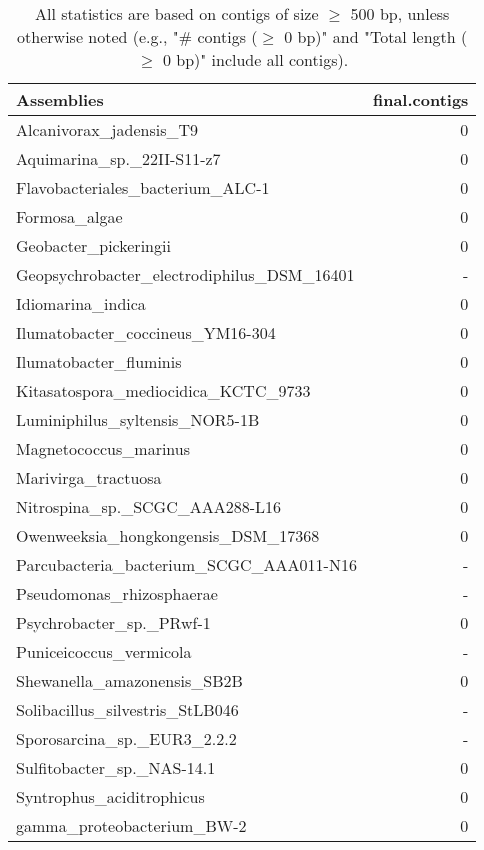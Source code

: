 \documentclass[12pt,a4paper]{article}
\begin{document}
\begin{table}[ht]
\begin{center}
\caption{All statistics are based on contigs of size $\geq$ 500 bp, unless otherwise noted (e.g., "\# contigs ($\geq$ 0 bp)" and "Total length ($\geq$ 0 bp)" include all contigs).}
\begin{tabular}{|l*{1}{|r}|}
\hline
Assemblies & final.contigs \\ \hline
Alcanivorax\_jadensis\_T9 & 0 \\ \hline
Aquimarina\_sp.\_22II-S11-z7 & 0 \\ \hline
Flavobacteriales\_bacterium\_ALC-1 & 0 \\ \hline
Formosa\_algae & 0 \\ \hline
Geobacter\_pickeringii & 0 \\ \hline
Geopsychrobacter\_electrodiphilus\_DSM\_16401 & - \\ \hline
Idiomarina\_indica & 0 \\ \hline
Ilumatobacter\_coccineus\_YM16-304 & 0 \\ \hline
Ilumatobacter\_fluminis & 0 \\ \hline
Kitasatospora\_mediocidica\_KCTC\_9733 & 0 \\ \hline
Luminiphilus\_syltensis\_NOR5-1B & 0 \\ \hline
Magnetococcus\_marinus & 0 \\ \hline
Marivirga\_tractuosa & 0 \\ \hline
Nitrospina\_sp.\_SCGC\_AAA288-L16 & 0 \\ \hline
Owenweeksia\_hongkongensis\_DSM\_17368 & 0 \\ \hline
Parcubacteria\_bacterium\_SCGC\_AAA011-N16 & - \\ \hline
Pseudomonas\_rhizosphaerae & - \\ \hline
Psychrobacter\_sp.\_PRwf-1 & 0 \\ \hline
Puniceicoccus\_vermicola & - \\ \hline
Shewanella\_amazonensis\_SB2B & 0 \\ \hline
Solibacillus\_silvestris\_StLB046 & - \\ \hline
Sporosarcina\_sp.\_EUR3\_2.2.2 & - \\ \hline
Sulfitobacter\_sp.\_NAS-14.1 & 0 \\ \hline
Syntrophus\_aciditrophicus & 0 \\ \hline
gamma\_proteobacterium\_BW-2 & 0 \\ \hline
\end{tabular}
\end{center}
\end{table}
\end{document}

